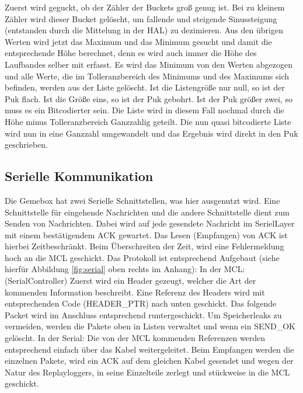 \documentclass[
   draft=false
  ,paper=a4
  ,twoside=true
  ,fontsize=11pt
  ,headsepline
  ,DIV11
  ,parskip=full+
]{scrartcl} %
\begin{document}
Zuerst wird geguckt, ob der Zähler der Buckets groß genug ist. Bei zu kleinem Zähler wird dieser Bucket gelöscht, um fallende und steigende Sinussteigung (entstanden durch die Mittelung in der HAL) zu dezimieren. 
Aus den übrigen Werten wird jetzt das Maximum und das Minimum gesucht und damit die entsprechende Höhe berechnet, denn es wird auch immer die Höhe des Laufbandes selber mit erfasst.
Es wird das Minimum von den Werten abgezogen und alle Werte, die im Tolleranzbereich des Minimums und des Maximums sich befinden, werden aus der Liste gelöscht. Ist die Listengröße 
nur null, so ist der Puk flach. Ist die Größe eins, so ist der Puk gebohrt.
Ist der Puk größer zwei, so muss es ein Bitcodierter sein. 
Die Liste wird in diesem Fall nochmal durch die Höhe minus Tolleranzbereich Ganzzahlig geteilt. Die nun quasi bitcodierte Liste wird nun in eine Ganzzahl umgewandelt und das Ergebnis wird direkt in den Puk geschrieben.
\subsection{Serielle Kommunikation}
Die Gemebox hat zwei Serielle Schnittstellen, was hier ausgenutzt wird. Eine Schnittstelle für eingehende Nachrichten und die andere Schnittstelle dient zum Senden von Nachrichten.
Dabei wird auf jede gesendete Nachricht im SerielLayer mit einem bestätigendem ACK gewartet. Das Lesen (Empfangen) von ACK ist hierbei Zeitbeschränkt. Beim Überschreiten der Zeit, wird eine Fehlermeldung hoch an die MCL geschickt.
Das Protokoll ist entsprechend Aufgebaut (siehe hierfür Abbildung \ref{fig:serial} oben rechts im Anhang):
\newline
In der MCL: (SerialController)
Zuerst wird ein Header gezeugt, welcher die Art der kommenden Information 
beschreibt. Eine Referenz des Headers wird mit entsprechenden Code 
(HEADER\_PTR) nach unten geschickt. Das folgende Packet wird im Anschluss entsprechend runtergeschickt. Um Speicherleaks zu vermeiden, werden die Pakete oben in Listen verwaltet und wenn ein SEND\_OK gelöscht.
\newline
In der Serial:
Die von der MCL kommenden Referenzen werden entsprechend einfach über das  Kabel weitergeleitet.
\newline
Beim Empfangen werden die einzelnen Pakete, wird ein ACK auf dem gleichen Kabel gesendet und wegen der Natur des Replayloggers, in seine Einzelteile zerlegt und stückweise in die MCL geschickt.
\end{document}
